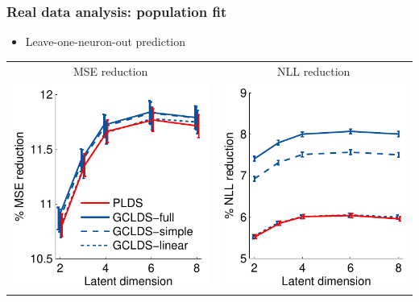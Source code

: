 \documentclass[16pt,presentation]{beamer}
\begin{document}
\begin{frame}
\frametitle{Real data analysis: population fit}
\begin{itemize}
\item Leave-one-neuron-out prediction
\end{itemize}
\begin{center}
\begin{tabular}[t]{cc}
{\small MSE reduction} & {\small NLL reduction} \\
\includegraphics[scale=0.5,clip = true]{figs/gclds/fig_MSE_band_George_Move_NULL.pdf}&
\includegraphics[scale=0.5,clip = true]{figs/gclds/fig_likelihood_band_George_Move_NULL.pdf}%

\end{tabular}
\end{center}
\end{frame}
\end{document}
